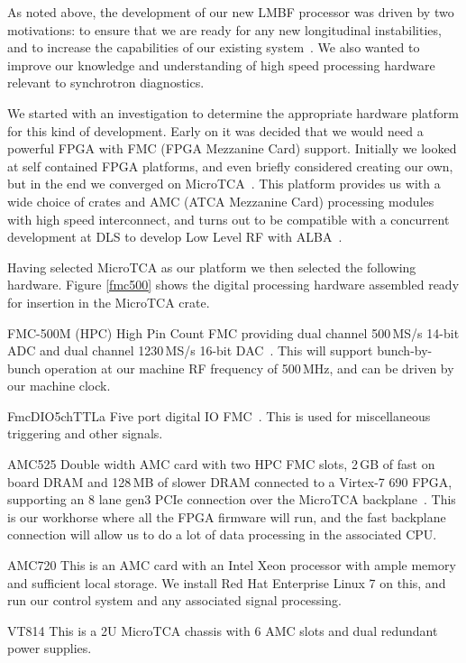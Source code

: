 \documentclass[
    a4paper,
    keeplastbox,            %
    hyphens,                %
    nospread,               %
]{jacow}
\begin{document}
As noted above, the development of our new LMBF processor was driven by two
motivations: to ensure that we are ready for any new longitudinal instabilities,
and to increase the capabilities of our existing system~\cite{ipac2017rf,
ibic2016}.  We also wanted to improve our knowledge and understanding of high
speed processing hardware relevant to synchrotron diagnostics.

We started with an investigation to determine the appropriate hardware platform
for this kind of development.  Early on it was decided that we would need a
powerful FPGA with FMC (FPGA Mezzanine Card) support.  Initially we looked at
self contained FPGA platforms, and even briefly considered creating our own, but
in the end we converged on MicroTCA~\cite{mtca}.  This platform provides us with
a wide choice of crates and AMC (ATCA Mezzanine Card) processing modules with
high speed interconnect, and turns out to be compatible with a concurrent
development at DLS to develop Low Level RF with ALBA~\cite{ipac2017llrf}.

Having selected MicroTCA as our platform we then selected the following
hardware.  Figure \ref{fmc500} shows the digital processing hardware assembled
ready for insertion in the MicroTCA crate.

\begin{Description}
\item[FMC-500M]
    (HPC) High Pin Count FMC providing dual channel 500\,MS/s 14-bit ADC and
    dual channel 1230\,MS/s 16-bit DAC~\cite{fmc500}.  This will support
    bunch-by-bunch operation at our machine RF frequency of 500\,MHz, and can be
    driven by our machine clock.
\item[FmcDIO5chTTLa]
    Five port digital IO FMC~\cite{fmcdio}.  This is used for miscellaneous
    triggering and other signals.
\item[AMC525]
    Double width AMC card with two HPC FMC slots, 2\,GB of fast on board DRAM
    and 128\,MB of slower DRAM connected to a Virtex-7 690 FPGA, supporting an 8
    lane gen3 PCIe connection over the MicroTCA backplane~\cite{amc525}.  This
    is our workhorse where all the FPGA firmware will run, and the fast
    backplane connection will allow us to do a lot of data processing in the
    associated CPU.
\item[AMC720]
    This is an AMC card with an Intel Xeon processor with ample memory and
    sufficient local storage.  We install Red Hat Enterprise Linux 7 on this,
    and run our control system and any associated signal processing.
\item[VT814]
    This is a 2U MicroTCA chassis with 6 AMC slots and dual redundant power
    supplies.
\end{Description}
\end{document}
